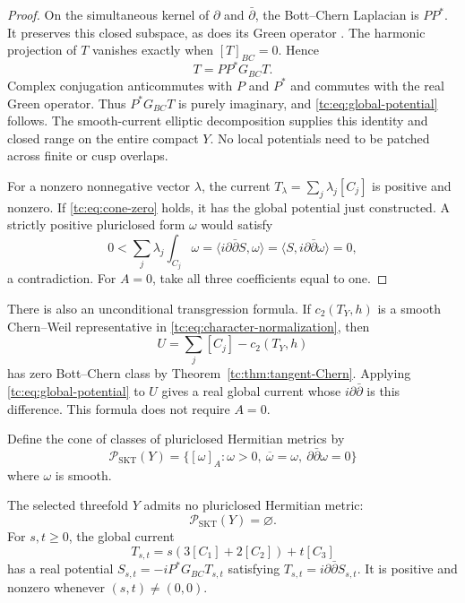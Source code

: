 \begin{proof}
On the simultaneous kernel of $\partial$ and $\bar\partial$,
the Bott--Chern Laplacian is $PP^*$.
It preserves this closed subspace, as does its Green operator
\cite[equations~(2.9)--(2.13)]{BSWCoherent}.
The harmonic projection of $T$ vanishes exactly when
$[T]_{BC}=0$. Hence
\[
                        T=PP^*G_{BC}T.
\]
Complex conjugation anticommutes with $P$ and $P^*$ and
commutes with the real Green operator.
Thus $P^*G_{BC}T$ is purely imaginary, and
\eqref{tc:eq:global-potential} follows.
The smooth-current elliptic decomposition supplies this identity
and closed range on the entire compact $Y$.
No local potentials need to be patched across finite or cusp
overlaps.

For a nonzero nonnegative vector $\lambda$, the current
$T_\lambda=\sum_j\lambda_j[C_j]$ is positive and nonzero.
If \eqref{tc:eq:cone-zero} holds, it has the global potential
just constructed. A strictly positive pluriclosed form $\omega$
would satisfy
\[
        0<\sum_j\lambda_j\int_{C_j}\omega
          =\langle i\partial\bar\partial S,\omega\rangle
          =\langle S,i\partial\bar\partial\omega\rangle=0,
\]
a contradiction. For $A=0$, take all three coefficients equal
to one.
\end{proof}

There is also an unconditional transgression formula.
If $c_2(T_Y,h)$ is a smooth Chern--Weil representative in
\eqref{tc:eq:character-normalization}, then
\[
 U=\sum_j[C_j]-c_2(T_Y,h)
\]
has zero Bott--Chern class by Theorem~\ref{tc:thm:tangent-Chern}.
Applying \eqref{tc:eq:global-potential} to $U$ gives a real
global current whose $i\partial\bar\partial$ is this difference.
This formula does not require $A=0$.

Define the cone of classes of pluriclosed Hermitian metrics by
\begin{equation}\label{tc:eq:SKT-cone}
 \mathcal P_{\mathrm{SKT}}(Y)
 =\{[\omega]_A:\omega>0,\ \overline\omega=\omega,
                         \ \partial\bar\partial\omega=0\}
\end{equation}
where $\omega$ is smooth.

\begin{theorem}\label{tc:thm:no-SKT}
The selected threefold $Y$ admits no pluriclosed Hermitian
metric:
\[
                         \mathcal P_{\mathrm{SKT}}(Y)=\varnothing.
\]
For $s,t\ge0$, the global current
\[
                  T_{s,t}=s(3[C_1]+2[C_2])+t[C_3]
\]
has a real potential
$S_{s,t}=-iP^*G_{BC}T_{s,t}$ satisfying
$T_{s,t}=i\partial\bar\partial S_{s,t}$.
It is positive and nonzero whenever $(s,t)\ne(0,0)$.
\end{theorem}


